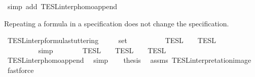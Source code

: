 \begin{isabellebody}
\ {\isacharparenleft}simp\ add{\isacharcolon}\ TESL{\isacharunderscore}interp{\isacharunderscore}homo{\isacharunderscore}append{\isacharparenright}%
\endisatagproof
{\isafoldproof}%
%
\isadelimproof
%
\endisadelimproof
%
\begin{isamarkuptext}%
Repeating a formula in a specification does not change the specification.%
\end{isamarkuptext}\isamarkuptrue%
\isamarkupfalse%
\ TESL{\isacharunderscore}interp{\isacharunderscore}formula{\isacharunderscore}stuttering{\isacharcolon}\isanewline
\ \ \ {\isacartoucheopen}{\isasymphi}\ {\isasymin}\ set\ {\isasymPhi}{\isacartoucheclose}\isanewline
\ \ \ \ \ {\isacartoucheopen}{\isasymlbrakk}{\isasymlbrakk}\ {\isasymphi}\ {\isacharhash}\ {\isasymPhi}\ {\isasymrbrakk}{\isasymrbrakk}\isactrlsub T\isactrlsub E\isactrlsub S\isactrlsub L\ {\isacharequal}\ {\isasymlbrakk}{\isasymlbrakk}\ {\isasymPhi}\ {\isasymrbrakk}{\isasymrbrakk}\isactrlsub T\isactrlsub E\isactrlsub S\isactrlsub L{\isacartoucheclose}\isanewline
%
\isadelimproof
%
\endisadelimproof
%
\isatagproof
{}\isamarkupfalse%
\ {\isacharminus}\isanewline
\ \ \isamarkupfalse%
\ {\isacartoucheopen}{\isasymphi}\ {\isacharhash}\ {\isasymPhi}\ {\isacharequal}\ {\isacharbrackleft}{\isasymphi}{\isacharbrackright}\ {\isacharat}\ {\isasymPhi}{\isacartoucheclose}\ \isamarkupfalse%
\ simp\isanewline
\ \ \isamarkupfalse%
\ {\isacartoucheopen}{\isasymlbrakk}{\isasymlbrakk}\ {\isasymphi}\ {\isacharhash}\ {\isasymPhi}\ {\isasymrbrakk}{\isasymrbrakk}\isactrlsub T\isactrlsub E\isactrlsub S\isactrlsub L\ {\isacharequal}\ {\isasymlbrakk}{\isasymlbrakk}\ {\isacharbrackleft}{\isasymphi}{\isacharbrackright}\ {\isasymrbrakk}{\isasymrbrakk}\isactrlsub T\isactrlsub E\isactrlsub S\isactrlsub L\ {\isasyminter}\ {\isasymlbrakk}{\isasymlbrakk}\ {\isasymPhi}\ {\isasymrbrakk}{\isasymrbrakk}\isactrlsub T\isactrlsub E\isactrlsub S\isactrlsub L{\isacartoucheclose}\isanewline
\ \ \ \ \isamarkupfalse%
\ TESL{\isacharunderscore}interp{\isacharunderscore}homo{\isacharunderscore}append\ \isamarkupfalse%
\ simp\isanewline
\ \ \isamarkupfalse%
\ {\isacharquery}thesis\ \isamarkupfalse%
\ assms\ TESL{\isacharunderscore}interpretation{\isacharunderscore}image\ \isamarkupfalse%
\ fastforce\isanewline
{}\isamarkupfalse%
%
\endisatagproof
{\isafoldproof}%
%
\isadelimproof
%
\endisadelimproof
%
\begin{isamarkuptext}%

\end{isamarkuptext}
\end{isabellebody}
